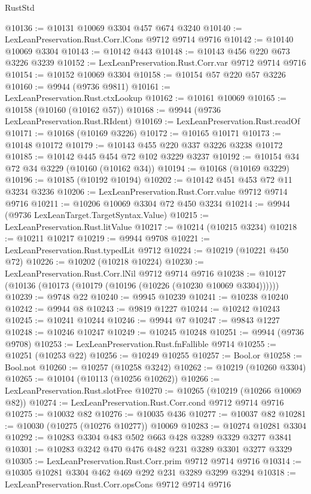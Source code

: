 \begin{lexlean}{RustStd}
\begin{coremodule}
@10136 := @10131 @10069 @3304 @457 @674 @3240
@10140 := LexLeanPreservation.Rust.Corr.lCons @9712 @9714 @9716
@10142 := @10140 @10069 @3304
@10143 := @10142 @443
@10148 := @10143 @456 @220 @673 @3226 @3239
@10152 := LexLeanPreservation.Rust.Corr.var @9712 @9714 @9716
@10154 := @10152 @10069 @3304
@10158 := @10154 @57 @220 @57 @3226
@10160 := @9944 (@9736 @9811)
@10161 := LexLeanPreservation.Rust.ctxLookup
@10162 := @10161 @10069
@10165 := @10158 (@10160 (@10162 @57))
@10168 := @9944 (@9736 LexLeanPreservation.Rust.RIdent)
@10169 := LexLeanPreservation.Rust.readOf
@10171 := @10168 (@10169 @3226)
@10172 := @10165 @10171
@10173 := @10148 @10172
@10179 := @10143 @455 @220 @337 @3226 @3238 @10172
@10185 := @10142 @445 @454 @72 @102 @3229 @3237
@10192 := @10154 @34 @72 @34 @3229 (@10160 (@10162 @34))
@10194 := @10168 (@10169 @3229)
@10196 := @10185 (@10192 @10194)
@10202 := @10142 @451 @453 @72 @11 @3234 @3236
@10206 := LexLeanPreservation.Rust.Corr.value @9712 @9714 @9716
@10211 := @10206 @10069 @3304 @72 @450 @3234
@10214 := @9944 (@9736 LexLeanTarget.TargetSyntax.Value)
@10215 := LexLeanPreservation.Rust.litValue
@10217 := @10214 (@10215 @3234)
@10218 := @10211 @10217
@10219 := @9944 @9708
@10221 := LexLeanPreservation.Rust.typedLit @9712
@10224 := @10219 (@10221 @450 @72)
@10226 := @10202 (@10218 @10224)
@10230 := LexLeanPreservation.Rust.Corr.lNil @9712 @9714 @9716
@10238 := @10127 (@10136 (@10173 (@10179 (@10196 (@10226 (@10230 @10069 @3304))))))
@10239 := @9748 @22
@10240 := @9945 @10239
@10241 := @10238 @10240
@10242 := @9944 @8
@10243 := @9819 @1227
@10244 := @10242 @10243
@10245 := @10241 @10244
@10246 := @9944 @7
@10247 := @9843 @1227
@10248 := @10246 @10247
@10249 := @10245 @10248
@10251 := @9944 (@9736 @9708)
@10253 := LexLeanPreservation.Rust.fnFallible @9714
@10255 := @10251 (@10253 @22)
@10256 := @10249 @10255
@10257 := Bool.or
@10258 := Bool.not
@10260 := @10257 (@10258 @3242)
@10262 := @10219 (@10260 @3304)
@10265 := @10104 (@10113 (@10256 @10262))
@10266 := LexLeanPreservation.Rust.slotFree
@10270 := @10265 (@10219 (@10266 @10069 @82))
@10274 := LexLeanPreservation.Rust.Corr.cond @9712 @9714 @9716
@10275 := @10032 @82
@10276 := @10035 @436
@10277 := @10037 @82
@10281 := @10030 (@10275 (@10276 @10277)) @10069
@10283 := @10274 @10281 @3304
@10292 := @10283 @3304 @483 @502 @663 @428 @3289 @3329 @3277 @3841
@10301 := @10283 @3242 @470 @476 @482 @231 @3289 @3301 @3277 @3329
@10305 := LexLeanPreservation.Rust.Corr.prim @9712 @9714 @9716
@10314 := @10305 @10281 @3304 @462 @469 @292 @231 @3289 @3299 @3294
@10318 := LexLeanPreservation.Rust.Corr.opsCons @9712 @9714 @9716

\end{coremodule}
\end{lexlean}
